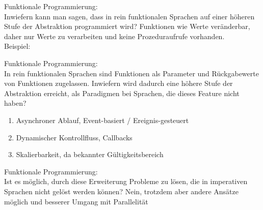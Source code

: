 \begin{card}
	Funktionale Programmierung:\\
	Inwiefern kann man sagen, dass in rein funktionalen Sprachen auf einer höheren Stufe der Abstraktion programmiert wird?
	\hr
	Funktionen wie Werte veränderbar, daher nur Werte zu verarbeiten und keine Prozeduraufrufe vorhanden.\\
	Beispiel: 
\end{card}

\begin{card}
	Funktionale Programmierung:\\
	In rein funktionalen Sprachen sind Funktionen als Parameter und Rückgabewerte von Funktionen zugelassen. Inwiefern wird dadurch eine höhere Stufe der Abstraktion erreicht, als Paradigmen bei Sprachen, die dieses Feature nicht haben?
	\hr
	\begin{enumerate}
	\item Asynchroner Ablauf, Event-basiert / Ereignis-gesteuert
	\item Dynamischer Kontrollfluss, Callbacks
	\item Skalierbarkeit, da bekannter Gültigkeitsbereich
	\end{enumerate}
\end{card}

\begin{card}
	Funktionale Programmierung:\\
	Ist es möglich, durch diese Erweiterung Probleme zu lösen, die in imperativen Sprachen nicht gelöst werden können?
	\hr
	Nein, trotzdem aber andere Ansätze möglich und besserer Umgang mit Parallelität
\end{card}
